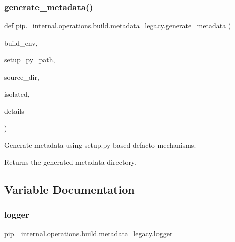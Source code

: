 \subsubsection{\texorpdfstring{generate\+\_\+metadata()}{generate\_metadata()}}
{\footnotesize\ttfamily def pip.\+\_\+internal.\+operations.\+build.\+metadata\+\_\+legacy.\+generate\+\_\+metadata (\begin{DoxyParamCaption}\item[{}]{build\+\_\+env,  }\item[{}]{setup\+\_\+py\+\_\+path,  }\item[{}]{source\+\_\+dir,  }\item[{}]{isolated,  }\item[{}]{details }\end{DoxyParamCaption})}

\begin{DoxyVerb}Generate metadata using setup.py-based defacto mechanisms.

Returns the generated metadata directory.
\end{DoxyVerb}
 

\subsection{Variable Documentation}
\mbox{\label{namespacepip_1_1__internal_1_1operations_1_1build_1_1metadata__legacy_ae07a76dc057c51776b8740cf4014eefd}} 
\subsubsection{\texorpdfstring{logger}{logger}}
{\footnotesize\ttfamily pip.\+\_\+internal.\+operations.\+build.\+metadata\+\_\+legacy.\+logger}

